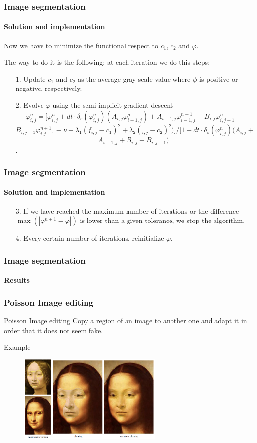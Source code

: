 \documentclass[11pt]{beamer}
\begin{document}
\begin{frame}
\frametitle{Image segmentation}
\framesubtitle{Solution and implementation}
Now we have to minimize the functional respect to $c_1$, $c_2$ and $\varphi$.

The way to do it is the following: at each iteration we do this steps:
\begin{enumerate}
\item[1.] Update $c_1$ and $c_2$ as the average gray scale value where $\phi$ is positive or negative, respectively.

\item [2.] Evolve $\varphi$ using the semi-implicit gradient descent 
$$\varphi_{i,j}^n = [\varphi_{i,j}^n + dt\cdot\delta_{\varepsilon}(\varphi_{i,j}^n)(A_{i,j}\varphi_{i+1,j}^n) + A_{i-1,j}\varphi_{i-1,j}^{n+1}+B_{i,j}\varphi_{i,j+1}^n+$$
$$B_{i, j-1}\varphi_{i,j-1}^{n+1}-\nu - \lambda_1(f_{i,j}-c_1)^2+\lambda_2(_{i,j}-c_2)^2) ]/[1 + dt\cdot\delta_{\varepsilon}(\varphi_{i,j}^n)(A_{i,j} +$$$$ A_{i-1,j} + B_{i,j} + B_{i,j-1})]$$. 
\end{enumerate}
\end{frame}

\begin{frame}
\frametitle{Image segmentation}
\framesubtitle{Solution and implementation}
\begin{itemize}
\item [3.] If we have reached the maximum number of iterations or the difference $\max(|\varphi^{n+1}-\varphi|)$ is lower than a given tolerance, we stop the algorithm.
\item [4.] Every certain number of iterations, reinitialize $\varphi$.
\end{itemize}
\end{frame}


\begin{frame}
\frametitle{Image segmentation}
\framesubtitle{Results}

\end{frame}


\begin{frame}
\frametitle{Poisson Image editing}

\begin{block}{Poisson Image editing}
Copy a region of an image to another one and adapt it in order that it does not seem fake.
\end{block}

\begin{exampleblock}{Example}
\begin{figure}
    \centering
    \includegraphics[width=70mm]{Example.png}
\end{figure}
\end{exampleblock}
\end{frame}
\end{document}
